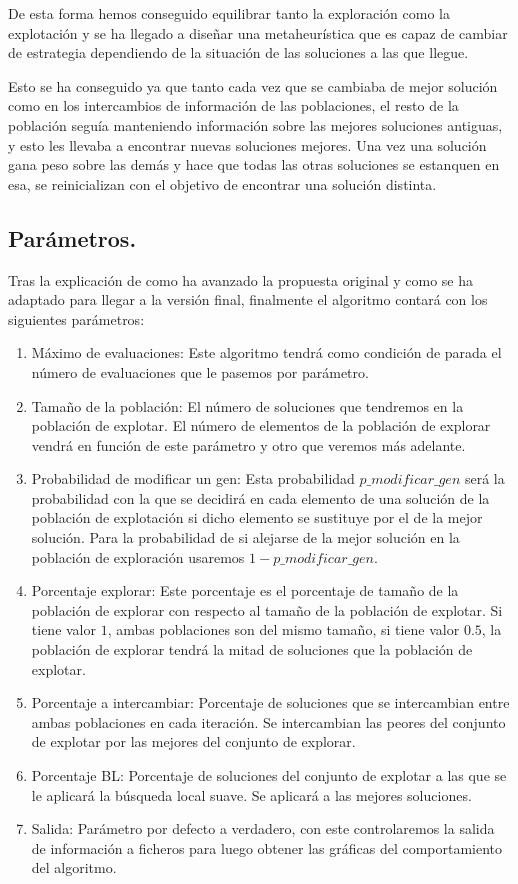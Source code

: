 \documentclass[12pt, spanish]{article}
\begin{document}
De esta forma hemos conseguido equilibrar tanto la exploración como la explotación y se ha llegado a diseñar una metaheurística que es capaz de cambiar de estrategia dependiendo de la situación de las soluciones a las que llegue.

Esto se ha conseguido ya que tanto cada vez que se cambiaba de mejor solución como en los intercambios de información de las poblaciones, el resto de la población seguía manteniendo información sobre las mejores soluciones antiguas, y esto les llevaba a encontrar nuevas soluciones mejores. Una vez una solución gana peso sobre las demás y hace que todas las otras soluciones se estanquen en esa, se reinicializan con el objetivo de encontrar una solución distinta.


\subsection{Parámetros.}

Tras la explicación de como ha avanzado la propuesta original y como se ha adaptado para llegar a la versión final, finalmente el algoritmo contará con los siguientes parámetros:

\begin{enumerate}
	\item Máximo de evaluaciones: Este algoritmo tendrá como condición de parada el número de evaluaciones que le pasemos por parámetro.
	\item Tamaño de la población: El número de soluciones que tendremos en la población de explotar. El número de elementos de la población de explorar vendrá en función de este parámetro y otro que veremos más adelante.
	\item Probabilidad de modificar un gen: Esta probabilidad $p\_modificar\_gen$ será la probabilidad con la que se decidirá en cada elemento de una solución de la población de explotación si dicho elemento se sustituye por el de la mejor solución. Para la probabilidad de si alejarse de la mejor solución en la población de exploración usaremos $1 - p\_modificar\_gen$.
	\item Porcentaje explorar: Este porcentaje es el porcentaje de tamaño de la población de explorar con respecto al tamaño de la población de explotar. Si tiene valor $1$, ambas poblaciones son del mismo tamaño, si tiene valor $0.5$, la población de explorar tendrá la mitad de soluciones que la población de explotar.
	\item Porcentaje a intercambiar: Porcentaje de soluciones que se intercambian entre ambas poblaciones en cada iteración. Se intercambian las peores del conjunto de explotar por las mejores del conjunto de explorar.
	\item Porcentaje BL: Porcentaje de soluciones del conjunto de explotar a las que se le aplicará la búsqueda local suave. Se aplicará a las mejores soluciones.
	\item Salida: Parámetro por defecto a verdadero, con este controlaremos la salida de información a ficheros para luego obtener las gráficas del comportamiento del algoritmo.
\end{enumerate}
\end{document}
